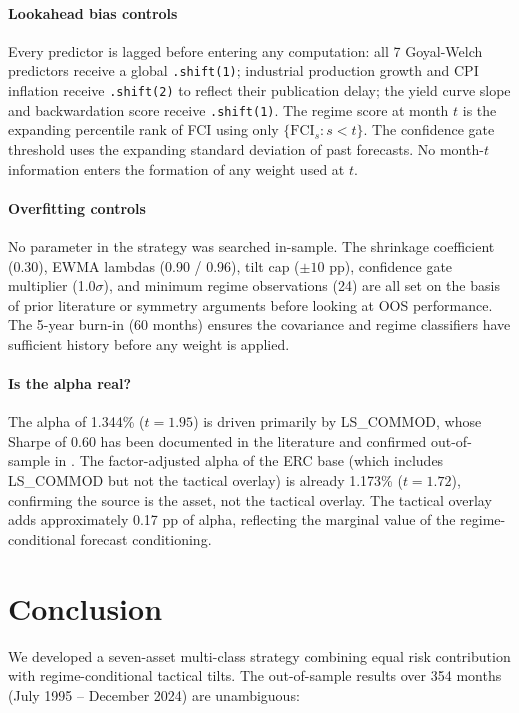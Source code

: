 \documentclass[11pt,letterpaper]{article}
\begin{document}
\paragraph{Lookahead bias controls}
Every predictor is lagged before entering any computation:
all 7 Goyal-Welch predictors receive a global \texttt{.shift(1)};
industrial production growth and CPI inflation receive \texttt{.shift(2)} to
reflect their publication delay; the yield curve slope and backwardation score
receive \texttt{.shift(1)}. The regime score at month $t$ is the expanding
percentile rank of FCI using only $\{\text{FCI}_s : s < t\}$. The confidence gate
threshold uses the expanding standard deviation of past forecasts.
No month-$t$ information enters the formation of any weight used at $t$.

\paragraph{Overfitting controls}
No parameter in the strategy was searched in-sample. The shrinkage coefficient
(0.30), EWMA lambdas (0.90 / 0.96), tilt cap ($\pm10$ pp), confidence gate
multiplier (1.0$\sigma$), and minimum regime observations (24) are all set
on the basis of prior literature or symmetry arguments before looking at OOS
performance. The 5-year burn-in (60 months) ensures the covariance and regime
classifiers have sufficient history before any weight is applied.

\paragraph{Is the alpha real?}
The alpha of 1.344\% ($t = 1.95$) is driven primarily by LS\_COMMOD, whose
Sharpe of 0.60 has been documented in the literature and confirmed out-of-sample
in \citet{Levine2018}. The factor-adjusted alpha of the ERC base (which includes
LS\_COMMOD but not the tactical overlay) is already 1.173\% ($t = 1.72$),
confirming the source is the asset, not the tactical overlay. The tactical overlay
adds approximately 0.17 pp of alpha, reflecting the marginal value of the regime-
conditional forecast conditioning.

\section{Conclusion}

We developed a seven-asset multi-class strategy combining equal risk contribution
with regime-conditional tactical tilts. The out-of-sample results over 354 months
(July 1995 -- December 2024) are unambiguous:
\end{document}
